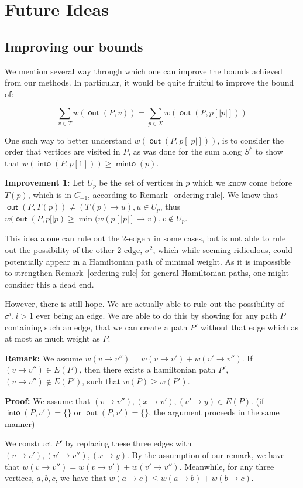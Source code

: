 \documentclass{article}
\DeclareMathOperator{\minto}{\bm{\mathsf{minto}}}
\DeclareMathOperator{\out}{\bm{\mathsf{out}}}
\DeclareMathOperator{\into}{\bm{\mathsf{into}}}
\begin{document}
\section{Future Ideas}

\subsection{Improving our bounds} \label{imp}

We mention several way through which one can improve the bounds achieved from our methods. In particular, it would be quite fruitful to improve the bound of:

\[ \sum_{v\in T} w(\out(P,v)) = \sum_{p \in X} w(\out(P,p[|p|])) \]

One such way to better understand $w(\out(P,p[|p|]))$, is to consider the order that vertices are visited in $P$, as was done for the sum along $S^*$ to show that $w(\into(P,p[1])) \geq \minto(p)$. 

\textbf{Improvement 1:} \label{rough} Let $U_p$ be the set of vertices in $p$ which we know come before $T(p)$, which is in $C_{-1}$, according to Remark~\ref{ordering rule}. We know that $\out(P,T(p)) \neq (T(p) \to u), u \in U_p$, thus $w(\out(P,p[|p) \geq \min(w(p[|p|] \to v), v\not \in U_p$. 

This idea alone can rule out the 2-edge $\tau$ in some cases, but is not able to rule out the possibility of the other 2-edge, $\sigma^2$, which while seeming ridiculous, could potentially appear in a Hamiltonian path of minimal weight. As it is impossible to strengthen Remark~\ref{ordering rule} for general Hamiltonian paths, one might consider this a dead end.

However, there is still hope. We are actually able to rule out the possibility of $\sigma^i, i > 1$ ever being an edge. We are able to do this by showing for any path $P$ containing such an edge, that we can create a path $P'$ without that edge which as at most as much weight as $P$.

\textbf{Remark:} We assume $w(v \to v'') = w(v \to v') + w(v' \to v'')$. If $(v\to v'') \in E(P)$, then there exists a hamiltonian path $P'$, $(v \to v'') \not \in E(P')$, such that $w(P) \geq w(P')$.

\textbf{Proof:} We assume that $(v \to v''), (x \to v'), (v' \to y) \in E(P)$. (if $\into(P,v') =\{\}$ or $\out(P,v') = \{\}$, the argument proceeds in the same manner)

We construct $P'$ by replacing these three edges with $(v \to v'),(v'\to v''), (x \to y)$. By the assumption of our remark, we have that $w(v\to v'') = w(v \to v') + w(v' \to v'')$. Meanwhile, for any three vertices, $a,b,c$, we have that $w(a\to c) \leq w(a\to b) + w(b\to c)$.
\end{document}

